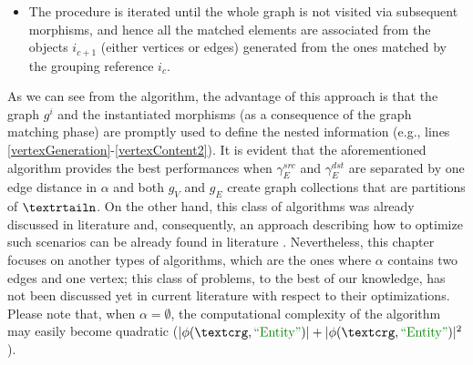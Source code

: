 \begin{itemize}
\item The procedure is iterated until the whole graph is not visited via subsequent morphisms, and hence all the matched elements are associated from the objects $i_{c+1}$ (either vertices or edges) generated from the ones matched by the grouping reference $i_c$.
\end{itemize}

As we can see from the algorithm, the advantage of this approach is that the graph $g^i$ and the instantiated morphisms (as a consequence of the graph matching phase) are promptly used to define the nested information (e.g., lines \ref{vertexGeneration}-\ref{vertexContent2}). It is evident that the aforementioned algorithm provides the best performances when $\gamma_E^{src}$ and $\gamma_E^{dst}$ are separated by  one edge distance in $\alpha$   and both $g_V$ and $g_E$ create graph collections that are partitions of $\nested$. On the other hand, this class of algorithms was already discussed in literature and, consequently, an approach describing how to optimize such  scenarios can be already found in literature \cite{JunghannsPR17}. Nevertheless, this chapter focuses on another types of algorithms, which are the ones where $\alpha$ contains two edges and one vertex; this class of problems, to the best of our knowledge, has not been discussed yet in current literature with respect to their optimizations. %
 Please note that, when $\alpha=\emptyset$, the computational complexity of the algorithm may easily become quadratic ($|\phi(\ngraph,\ONTA)|+|\phi(\ngraph,\ONTA)|^2$).


